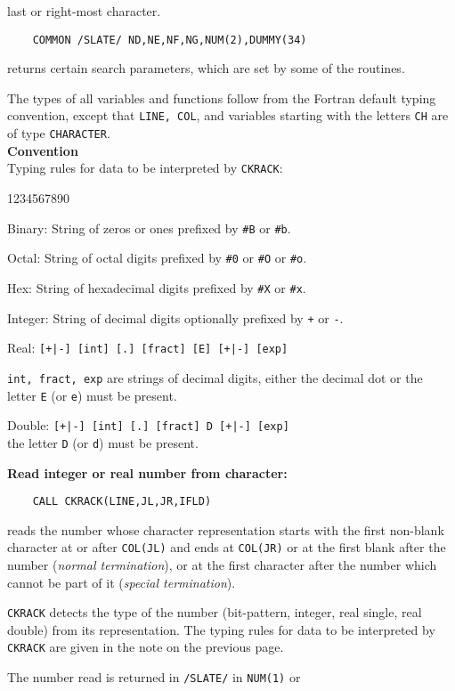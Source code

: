 last or right-most character.
\begin{verbatim}
    COMMON /SLATE/ ND,NE,NF,NG,NUM(2),DUMMY(34)
\end{verbatim}
 returns certain search parameters, which are set by some of the
 routines.
\par
The types of all variables and functions follow from the Fortran
default typing convention, except that {\tt LINE, COL}, and
variables starting with the letters {\tt CH} are
of type {\tt CHARACTER}.  \\[3mm]
{\bf Convention}\\[2mm]
Typing rules for data to be interpreted by {\tt CKRACK}:
\begin{DLtt}{1234567890}
\item[Binary:] String of zeros or ones prefixed by {\tt \#B} or
{\tt \#b}.
\item[Octal:] String of octal digits prefixed by {\tt \#0} or {\tt \#O}
or {\tt \#o}.
\item[Hex:] String of hexadecimal digits prefixed by {\tt \#X} or
{\tt \#x}.
\item[Integer:] String of decimal digits optionally prefixed by {\tt +}
or {\tt -}.
\item[Real:] {\tt [+|-] [int] [.] [fract] [E] [+|-] [exp]}\\
\parbox[t]{142mm}{
{\tt int, fract, exp} are strings of decimal digits, either the decimal
dot or the letter {\tt E} (or {\tt e}) must be present.}
\item[Double:] {\tt [+|-] [int] [.] [fract] D [+|-] [exp]}\\
the letter {\tt D} (or {\tt d}) must be present.
\end{DLtt}
\newpage
{\bf Read integer or real number from character:}
\begin{verbatim}
    CALL CKRACK(LINE,JL,JR,IFLD)
\end{verbatim}
reads the number whose character representation starts with
the first non-blank character at or after {\tt COL(JL)}
and ends at {\tt COL(JR)} or at the first blank after the number
({\it normal termination}),
or at the first character after the number which cannot be part of it
({\it special termination}).
\par
{\tt CKRACK} detects the type of the number (bit-pattern, integer,
real single, real double) from its representation.
The typing rules for data to be interpreted by {\tt CKRACK} are
given in the note on the previous page.
\par
The number read is returned in {\tt /SLATE/} in {\tt NUM(1)} or
